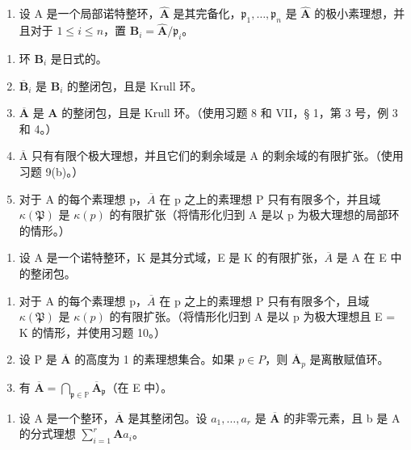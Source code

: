 \begin{enumerate}
\def\labelenumi{\arabic{enumi})}
\setcounter{enumi}{9}
\tightlist
\item
  设 A 是一个局部诺特整环，\(\hat{\mathbf{A}}\) 是其完备化，\(\mathfrak{p}_1, \ldots, \mathfrak{p}_n\) 是 \(\hat{\mathbf{A}}\) 的极小素理想，并且对于 \(1 \leqslant i \leqslant n\)，置 \(\mathbf{B}_i = \hat{\mathbf{A}} / \mathfrak{p}_i\)。
\end{enumerate}

\begin{enumerate}
\def\labelenumi{\alph{enumi})}
\item
  环 \(\mathbf{B}_i\) 是日式的。
\item
  \(\overline{\mathbf{B}}_{i}\) 是 \(\mathbf{B}_{i}\) 的整闭包，且是 Krull 环。
\item
  \(\overline{\mathbf{A}}\) 是 \(\mathbf{A}\) 的整闭包，且是 Krull 环。（使用习题 8 和 VII，§ 1，第 3 号，例 3 和 4。）
\item
  \(\overline{\mathrm{A}}\) 只有有限个极大理想，并且它们的剩余域是 A 的剩余域的有限扩张。（使用习题 9(b)。）
\item
  对于 A 的每个素理想 p，\(\overline{A}\) 在 p 之上的素理想 P 只有有限多个，并且域 \(\kappa(\mathfrak{P})\) 是 \(\kappa(p)\) 的有限扩张（将情形化归到 A 是以 p 为极大理想的局部环的情形。）
\end{enumerate}

\begin{enumerate}
\def\labelenumi{\arabic{enumi})}
\setcounter{enumi}{10}
\tightlist
\item
  设 A 是一个诺特整环，K 是其分式域，E 是 K 的有限扩张，\(\overline{A}\) 是 A 在 E 中的整闭包。
\end{enumerate}

\begin{enumerate}
\def\labelenumi{\alph{enumi})}
\item
  对于 A 的每个素理想 p，\(\overline{A}\) 在 p 之上的素理想 P 只有有限多个，且域 \(\kappa(\mathfrak{P})\) 是 \(\kappa(p)\) 的有限扩张。（将情形化归到 A 是以 p 为极大理想且 E = K 的情形，并使用习题 10。）
\item
  设 P 是 \(\overline{\mathbf{A}}\) 的高度为 1 的素理想集合。如果 \(p \in P\)，则 \(\overline{\mathbf{A}}_p\) 是离散赋值环。
\item
  有 \(\overline{\mathbf{A}} = \bigcap_{\mathfrak{p} \in \mathbb{P}} \overline{\mathbf{A}}_{\mathfrak{p}}\)（在 E 中）。
\end{enumerate}

\begin{enumerate}
\def\labelenumi{\arabic{enumi})}
\setcounter{enumi}{11}
\tightlist
\item
  设 A 是一个整环，\(\overline{\mathbf{A}}\) 是其整闭包。设 \(a_1, \ldots, a_r\) 是 \(\overline{\mathbf{A}}\) 的非零元素，且 b 是 A 的分式理想 \(\sum_{i=1}^{r} \mathbf{A}a_i\)。
\end{enumerate}

